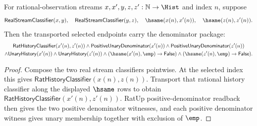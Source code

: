 \begin{theorem}
\label{thm:real-stream-classifier-finite-prefix-transported-endpoint-denominator-package}
For rational-observation streams \(x,x',y,z,z':\mathbb{N}\to\Hist\) and index
\(n\), suppose
$$
\mathsf{RealStreamClassifier}(x,y),\quad
\mathsf{RealStreamClassifier}(y,z),\quad
\hsame(x(n),x'(n)),\quad
\hsame(z(n),z'(n)).
$$
Then the transported selected endpoints carry the denominator package:
$$
\begin{gathered}
\mathsf{RatHistoryClassifier}(x'(n),z'(n))
\land\mathsf{PositiveUnaryDenominator}(x'(n))
\land\mathsf{PositiveUnaryDenominator}(z'(n))\\
\land\mathsf{UnaryHistory}(x'(n))
\land\mathsf{UnaryHistory}(z'(n))
\land(\hsame(x'(n),\emp)\to\mathsf{False})
\land(\hsame(z'(n),\emp)\to\mathsf{False}).
\end{gathered}
$$
\end{theorem}
\begin{proof}
Compose the two real stream classifiers pointwise. At the selected index this
gives \(\mathsf{RatHistoryClassifier}(x(n),z(n))\). Transport that rational
history classifier along the displayed \(\hsame\) rows to obtain
\(\mathsf{RatHistoryClassifier}(x'(n),z'(n))\). RatUp positive-denominator
readback then gives the two positive denominator witnesses, and each positive
denominator witness gives unary membership together with exclusion of
\(\emp\).
\end{proof}

